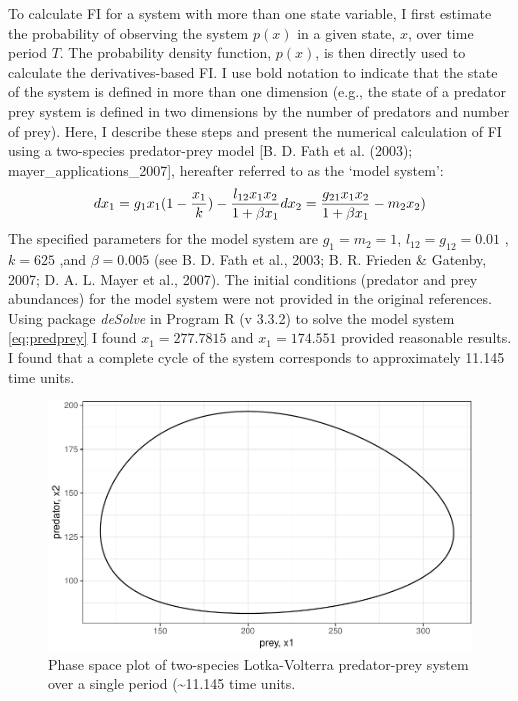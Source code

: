 \documentclass[12pt,twoside,openany]{reedthesis}
\begin{document}
To calculate FI for a system with more than one state variable, I first
estimate the probability of observing the system \(p(x)\) in a given
state, \(x\), over time period \(T\). The probability density function,
\(p(x)\), is then directly used to calculate the derivatives-based FI. I
use bold notation to indicate that the state of the system is defined in
more than one dimension (e.g., the state of a predator prey system is
defined in two dimensions by the number of predators and number of
prey). Here, I describe these steps and present the numerical
calculation of FI using a two-species predator-prey model {[}B. D. Fath
et al. (2003); mayer\_applications\_2007{]}, hereafter referred to as
the `model system':
\begin{equation} 
  dx_1 = g_{1}x_{1}(1-\frac{x_1}{k})- \frac{l_{12} x_{1} x_{2}}{1+\beta x_{1}} \\
  dx_2 = \frac{g_{21}x_1 x_2}{1+\beta x_1} - m_2 x_2)
  \label{eq:predprey}
\end{equation}
The specified parameters for the model system are \(g_1=m_2=1\),
\(l_12=g_12 = 0.01\) , \(k=625\) ,and \(\beta=0.005\) (see B. D. Fath et
al., 2003; B. R. Frieden \& Gatenby, 2007; D. A. L. Mayer et al., 2007).
The initial conditions (predator and prey abundances) for the model
system were not provided in the original references. Using package
\emph{deSolve} in Program R (v 3.3.2) to solve the model system
\eqref{eq:predprey} I found \(x_1 = 277.7815\) and \(x_1= 174.551\)
provided reasonable results. I found that a complete cycle of the system
corresponds to approximately 11.145 time units.
\begin{figure}
\centering
\includegraphics{_myDissertation_files/figure-latex/pp1Period-1.pdf}
\caption{\label{fig:pp1Period}Phase space plot of two-species Lotka-Volterra
predator-prey system over a single period (\textasciitilde{}11.145 time
units.}
\end{figure}
\end{document}

